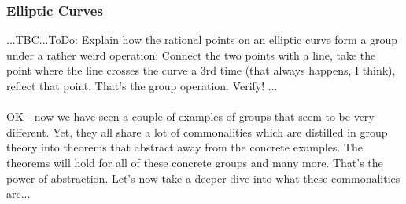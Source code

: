 






\subsubsection{Elliptic Curves} ...TBC...ToDo: Explain how the rational points on an elliptic curve form a group under a rather weird operation: Connect the two points with a line, take the point where the line crosses the curve a 3rd time (that always happens, I think), reflect that point. That's the group operation. Verify! ...



\paragraph{}
OK - now we have seen a couple of examples of groups that seem to be very different. Yet, they all share a lot of commonalities which are distilled in group theory into theorems that abstract away from the concrete examples. The theorems will hold for all of these concrete groups and many more. That's the power of abstraction. Let's now take a deeper dive into what these commonalities are...

